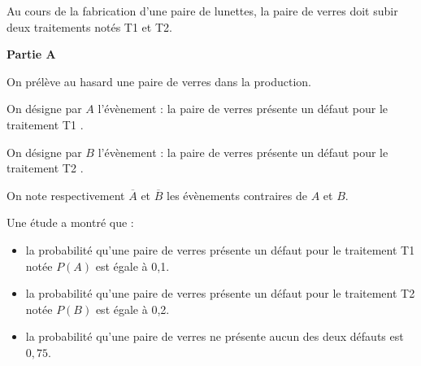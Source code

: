 \documentclass[11pt,a4paper,french]{article}
\begin{document}
Au cours de la fabrication d'une paire de lunettes, la paire de verres doit subir deux traitements notés T1 et T2.

\bigskip

\textbf{Partie A}

\medskip

On prélève au hasard une paire de verres dans la production.

On désigne par $A$ l'évènement : \og la paire de verres présente un défaut pour le traitement T1 \fg.

On désigne par $B$ l'évènement : \og la paire de verres présente un défaut pour le traitement T2 \fg.

On note respectivement $\overline{A}$ et $\overline{B}$ les évènements contraires de $A$ et $B$.

Une étude a montré que :

\begin{itemize}
\item la probabilité qu'une paire de verres présente un défaut pour le traitement T1 notée $P(A)$ est égale à 0,1.
\item la probabilité qu'une paire de verres présente un défaut pour le traitement T2 notée $P(B)$ est égale à 0,2.
\item la probabilité qu'une paire de verres ne présente aucun des deux défauts est $0,75$.
\end{itemize}

\medskip
\end{document}
